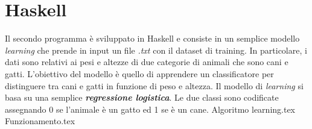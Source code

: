 \documentclass[
	a4paper,
	cleardoublepage=empty,
	headings=twolinechapter,
	numbers=autoenddot,
]{scrbook}
\begin{document}
	\chapter{Haskell}	
	Il secondo programma è sviluppato in Haskell e consiste in un semplice modello \textit{learning} che prende in input un file \textit{.txt} con il dataset di training. In particolare, i dati sono relativi ai pesi e altezze di due categorie di animali che sono cani e gatti. L'obiettivo del modello è quello di apprendere un classificatore per distinguere tra cani e gatti in funzione di peso e altezza. Il modello di \textit{learning} si basa su una semplice \textit{\textbf{regressione logistica}}. Le due classi sono codificate assegnando 0 se l'animale è un gatto ed 1 se è un cane.
	{Algoritmo learning.tex}
	{Funzionamento.tex}
	
	
\end{document}
